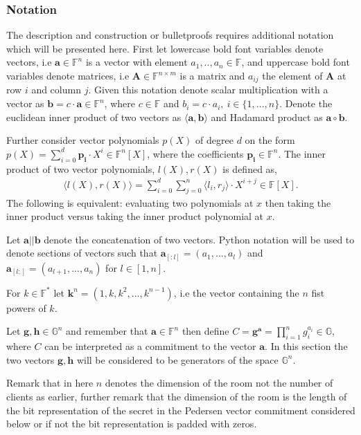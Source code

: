 \subsubsection*{Notation}
The description and construction or bulletproofs requires additional notation which will be presented here. First let lowercase bold font variables denote vectors, i.e $\mathbf{a}\in\mathds{F}^n$ is a vector with element $a_1,..,a_n \in \mathds{F}$, and uppercase bold font variables denote matrices, i.e $\mathbf{A}\in\mathds{F}^{n\times m}$ is a matrix and $a_{ij}$ the element of $\mathbf{A}$ at row $i$ and column $j$. Given this notation denote scalar multiplication with a vector as $\mathbf{b}=c\cdot \mathbf{a}\in\mathds{F}^n$, where $c\in\mathds{F}$ and  $b_i=c\cdot a_i, \: i\in\{1,...,n\}$. Denote the euclidean inner product of two vectors as $\langle \mathbf{a},\mathbf{b}\rangle$ and Hadamard product as $\mathbf{a}\circ \mathbf{b}$.

Further consider vector polynomials $p(X)$ of degree $d$ on the form $p(X)=\sum_{i=0}^d \mathbf{p_i}\cdot X^i\in\mathds{F}^n[X]$, where the coefficients $\mathbf{p_i}\in\mathds{F}^n$. The inner product of two vector polynomials, $l(X),r(X)$ is defined as, 
\begin{align*}
    \langle l(X),r(X)\rangle = \sum_{i=0}^d\sum_{j=0}^n \langle l_i,r_j\rangle \cdot X^{i+j}\in\mathds{F}[X].
\end{align*}
The following is equivalent: evaluating two polynomials at $x$ then taking the inner product versus taking the inner product polynomial at $x$.

Let $\mathbf{a}||\mathbf{b}$ denote the concatenation of two vectors. Python notation will be used to denote sections of vectors such that $\mathbf{a}_{[:l]} = (a_1,...,a_l)$ and $\mathbf{a}_{[l:]} = (a_{l+1},...,a_n)$ for $l\in[1,n]$. 

For $k\in\mathds{F}^*$ let $\mathbf{k}^n=(1,k,k^2,...,k^{n-1})$, i.e the vector containing the $n$ fist powers of $k$. 

Let $\mathbf{g},\mathbf{h}\in\mathds{G}^n$ and remember that $\mathbf{a}\in\mathds{F}^n$ then define $C= \mathbf{g}^\mathbf{a} = \prod_{i=1}^ng_i^{a_i}\in\mathds{G}$, where $C$ can be interpreted as a commitment to the vector $\mathbf{a}$. In this section the two vectors $\mathbf{g},\mathbf{h}$ will be considered to be generators of the space $\mathds{G}^n$.

Remark that in here $n$ denotes the dimension of the room not the number of clients as earlier, further remark that the dimension of the room is the length of the bit representation of the secret in the Pedersen vector commitment considered below or if not the bit representation is padded with zeros.

